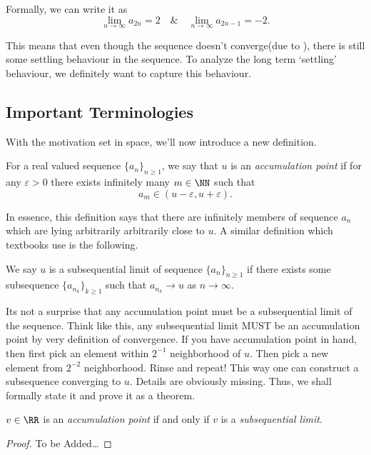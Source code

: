\documentclass[parskip=half, numbers=endperiod, 11pt]{scrartcl}
\begin{document}
Formally, we can write it as
\[\lim_{n \to \infty} a_{2n} = 2 \quad \text{\&} \quad \lim_{n \to \infty} a_{2n-1} = -2.\]

This means that even though the sequence doesn't
converge(due to ), there is still some
settling behaviour in the sequence. To analyze the
long term `settling' behaviour, we definitely want to
capture this behaviour.

\subsection{Important Terminologies}
With the motivation set in space, we'll now introduce a new
definition.

\begin{definition}
	For a real valued sequence $\{a_n\}_{n \ge 1}$, we
	say that $u$ is an \emph{accumulation point} if
	for any $\varepsilon > 0$ there exists infinitely
	many $m \in \NN$
	such that
	\[a_m \in (u-\varepsilon, u + \varepsilon). \]
\end{definition}

In essence, this definition says that there are infinitely
members of sequence $a_n$ which are lying arbitrarily
arbitrarily close to $u$. A similar definition which
textbooks use is the following.

\begin{definition}
	We say $u$ is a subsequential limit of sequence
	$\{a_n\}_{n \ge 1}$ if there exists some subsequence
	$\{a_{n_k}\}_{k \ge 1}$ such that $a_{n_k} \to u$ as
	$n \to \infty$.
\end{definition}

Its not a surprise that any accumulation point must be a
subsequential limit of the sequence. Think like this,
any subsequential limit MUST be an accumulation
point by very definition of convergence. If you have
accumulation point in hand, then first pick an element
within $2^{-1}$ neighborhood of $u$. Then pick a new
element from $2^{-2}$ neighborhood. Rinse and repeat!
This way one can construct a subsequence converging to
$u$. Details are obviously missing. Thus, we shall
formally state it and prove it as a theorem.

\begin{theorem}\label{thm:accum-pt_is_subseq_lim}
	$v \in \RR$ is an \emph{accumulation point} if and
	only if $v$ is a \emph{subsequential limit}.
\end{theorem}
\begin{proof}
	{\Large To be Added\dots}
\end{proof}
\end{document}
